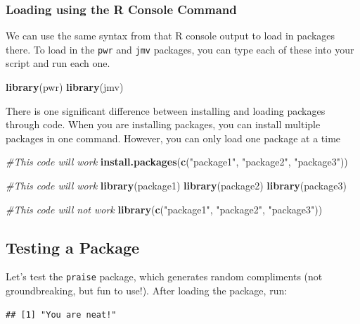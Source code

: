 \documentclass[
]{book}
\newenvironment{Shaded}{\begin{snugshade}}{\end{snugshade}}
\newcommand{\CommentTok}[1]{\textcolor[rgb]{0.56,0.35,0.01}{\textit{#1}}}
\newcommand{\FunctionTok}[1]{\textcolor[rgb]{0.13,0.29,0.53}{\textbf{#1}}}
\newcommand{\NormalTok}[1]{#1}
\newcommand{\StringTok}[1]{\textcolor[rgb]{0.31,0.60,0.02}{#1}}
\begin{document}
\subsubsection{Loading using the R Console Command}\label{loading-using-the-r-console-command}

We can use the same syntax from that R console output to load in packages there. To load in the \texttt{pwr} and \texttt{jmv} packages, you can type each of these into your script and run each one.

\begin{Shaded}
\begin{Highlighting}[]
\FunctionTok{library}\NormalTok{(pwr)}
\FunctionTok{library}\NormalTok{(jmv)}
\end{Highlighting}
\end{Shaded}

There is one significant difference between installing and loading packages through code. When you are installing packages, you can install multiple packages in one command. However, you can only load one package at a time

\begin{Shaded}
\begin{Highlighting}[]
\CommentTok{\#This code will work}
\FunctionTok{install.packages}\NormalTok{(}\FunctionTok{c}\NormalTok{(}\StringTok{"package1"}\NormalTok{, }\StringTok{"package2"}\NormalTok{, }\StringTok{"package3"}\NormalTok{)) }


\CommentTok{\#This code will work}
\FunctionTok{library}\NormalTok{(package1)}
\FunctionTok{library}\NormalTok{(package2)}
\FunctionTok{library}\NormalTok{(package3)}


\CommentTok{\#This code will not work}
\FunctionTok{library}\NormalTok{(}\FunctionTok{c}\NormalTok{(}\StringTok{"package1"}\NormalTok{, }\StringTok{"package2"}\NormalTok{, }\StringTok{"package3"}\NormalTok{)) }
\end{Highlighting}
\end{Shaded}

\subsection{Testing a Package}\label{testing-a-package}

Let's test the \texttt{praise} package, which generates random compliments (not groundbreaking, but fun to use!). After loading the package, run:

\begin{verbatim}
## [1] "You are neat!"
\end{verbatim}
\end{document}
